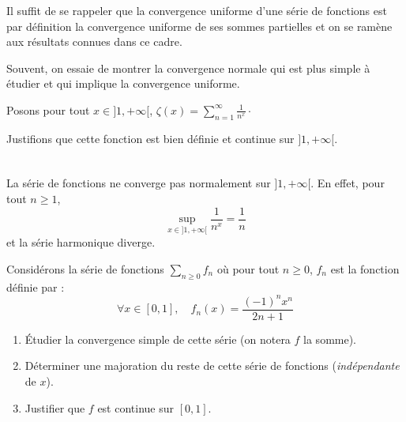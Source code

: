 \documentclass[a4paper,10pt]{report}
\begin{document}
\begin{Demonstration}{} 
Il suffit de se rappeler que la convergence uniforme d'une série de fonctions est par définition la convergence uniforme de ses sommes partielles et on se ramène aux résultats connues dans ce cadre.
\end{Demonstration}

\begin{Remarque}{} Souvent, on essaie de montrer la convergence normale qui est plus simple à étudier et qui implique la convergence uniforme.
\end{Remarque}

\begin{Exemple} Posons pour tout $x \in ]1, + \infty[$, $\zeta(x) = \sum_{n=1}^{\infty} \frac{1}{n^x} \cdot$

Justifions que cette fonction est bien définie et continue sur $]1, + \infty[$.

\medskip
%
%
%
%

\vspace{8cm}
\newpage

$\phantom{test}$

\vspace{5cm}
\end{Exemple}

\begin{Remarque}{}
La série de fonctions ne converge pas normalement sur $]1, + \infty[$. En effet, pour tout $n \geq 1$,
$$ \sup_{x \in ]1, + \infty[} \frac{1}{n^x} = \frac{1}{n}$$
et la série harmonique diverge.
\end{Remarque}

\begin{ApplicationDirecte} Considérons la série de fonctions $\sum_{n \geq 0} f_n$ où pour tout $n \geq 0$, $f_n$ est la fonction définie par :
$$  \forall x \in [0,1], \quad f_n(x) = \frac{(-1)^n x^n}{2n+1}$$
\begin{enumerate}
\item Étudier la convergence simple de cette série (on notera $f$ la somme).
\item Déterminer une majoration du reste de cette série de fonctions (\emph{indépendante} de $x$).
\item Justifier que $f$ est continue sur $[0,1]$.
\end{enumerate}
\end{ApplicationDirecte}
\end{document}
